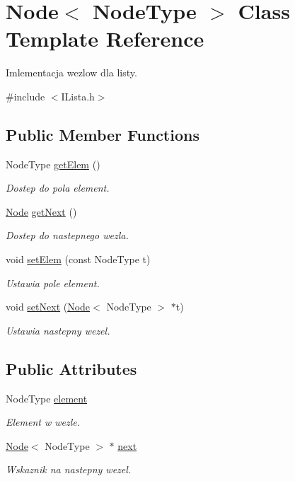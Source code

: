 \hypertarget{class_node}{\section{Node$<$ Node\-Type $>$ Class Template Reference}
\label{class_node}
}


Imlementacja wezlow dla listy.  




{\ttfamily \#include $<$I\-Lista.\-h$>$}

\subsection*{Public Member Functions}
\begin{DoxyCompactItemize}
\item 
Node\-Type \hyperlink{class_node_a269284208819633cd6236f4da3c6bb68}{get\-Elem} ()
\begin{DoxyCompactList}\small\item\em Dostep do pola element. \end{DoxyCompactList}\item 
\hyperlink{class_node}{Node} \hyperlink{class_node_a4682a79b0e1b2ff33ce06fd0c8c5d6c7}{get\-Next} ()
\begin{DoxyCompactList}\small\item\em Dostep do nastepnego wezla. \end{DoxyCompactList}\item 
void \hyperlink{class_node_a61dd2669b5fc024125c60dd7fa1d8a42}{set\-Elem} (const Node\-Type t)
\begin{DoxyCompactList}\small\item\em Ustawia pole element. \end{DoxyCompactList}\item 
void \hyperlink{class_node_ae4c31b2f94885e6a4450a4f9f3d059af}{set\-Next} (\hyperlink{class_node}{Node}$<$ Node\-Type $>$ $\ast$t)
\begin{DoxyCompactList}\small\item\em Ustawia nastepny wezel. \end{DoxyCompactList}\end{DoxyCompactItemize}
\subsection*{Public Attributes}
\begin{DoxyCompactItemize}
\item 
Node\-Type \hyperlink{class_node_a7ae3a8a0cf4c0d490402599bd5d11c88}{element}
\begin{DoxyCompactList}\small\item\em Element w wezle. \end{DoxyCompactList}\item 
\hyperlink{class_node}{Node}$<$ Node\-Type $>$ $\ast$ \hyperlink{class_node_aa95538a7c96479172f550fefc6cc0074}{next}
\begin{DoxyCompactList}\small\item\em Wskaznik na nastepny wezel. \end{DoxyCompactList}\end{DoxyCompactItemize}
